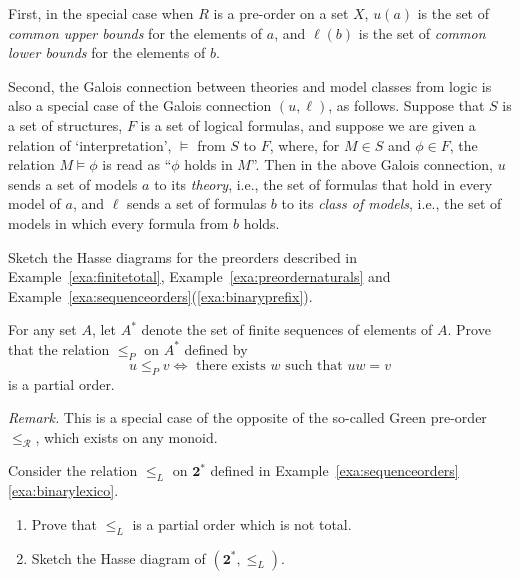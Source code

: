  First, in the special case when $R$ is a pre-order on a set $X$, $u(a)$ is the set of \emph{common upper bounds} for the elements of $a$, and $\ell(b)$ is the set of \emph{common lower bounds} for the elements of $b$.

  Second, the Galois connection between theories and model classes from logic is also a special case of the Galois connection $(u,\ell)$, as follows. Suppose that $S$ is a set of structures, $F$ is a set of logical formulas, and suppose we are given a relation of `interpretation', $\models$ from $S$ to $F$, where, for $M \in S$ and $\phi \in F$, the relation $M \models \phi$ is read as ``$\phi$ holds in $M$''. Then in the above Galois connection, $u$ sends a set of models $a$ to its \emph{theory}, i.e., the set of formulas that hold in every model of $a$, and $\ell$ sends a set of formulas $b$ to its \emph{class of models}, i.e., the set of models in which every formula from $b$ holds.





\exercises


\begin{exercise}\label{exe:hasse}
Sketch the Hasse diagrams for the preorders described in Example~\ref{exa:finitetotal}, Example~\ref{exa:preordernaturals} and Example~\ref{exa:sequenceorders}(\ref{exa:binaryprefix}).

\end{exercise}

\begin{exercise}\label{exe:prefixorder}
For any set $A$, let $A^*$ denote the set of finite sequences of elements of $A$. Prove that the relation $\leq_P$ on $A^*$ defined by
\[ u \leq_P v \iff \text{ there exists } w \text{ such that } uw = v\]
is a partial order.

{\it Remark.} This is a special case of the opposite of the so-called Green pre-order $\leq_{\mathcal{R}}$, which exists on any monoid.
\end{exercise}

\begin{exercise}\label{exe:lexico}
Consider the relation $\leq_L$ on $\mathbf{2}^*$ defined in Example~\ref{exa:sequenceorders}\ref{exa:binarylexico}.
\begin{enumerate}
\item Prove that $\leq_L$ is a partial order which is not total.
\item Sketch the Hasse diagram of $(\mathbf{2}^*,\leq_L)$.
\end{enumerate}
\end{exercise}

